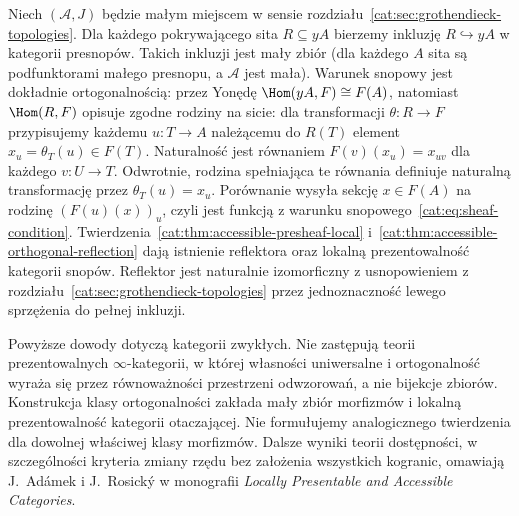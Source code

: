 \begin{przyklad}\label{cat:ex:accessible-orthogonal-sheaves}
Niech $(\mathcal A,J)$ będzie małym miejscem w sensie rozdziału~\ref{cat:sec:grothendieck-topologies}. Dla każdego pokrywającego sita $R\subseteq yA$ bierzemy inkluzję $R\hookrightarrow yA$ w kategorii presnopów. Takich inkluzji jest mały zbiór (dla każdego $A$ sita są podfunktorami małego presnopu, a $\mathcal A$ jest mała). Warunek snopowy jest dokładnie ortogonalnością: przez Yonędę $\Hom(yA,F)\cong F(A)$, natomiast $\Hom(R,F)$ opisuje zgodne rodziny na sicie: dla transformacji $\theta:R\to F$ przypisujemy każdemu $u:T\to A$ należącemu do $R(T)$ element $x_u=\theta_T(u)\in F(T)$. Naturalność jest równaniem $F(v)(x_u)=x_{uv}$ dla każdego $v:U\to T$. Odwrotnie, rodzina spełniająca te równania definiuje naturalną transformację przez $\theta_T(u)=x_u$. Porównanie wysyła sekcję $x\in F(A)$ na rodzinę $(F(u)(x))_u$, czyli jest funkcją z warunku snopowego~\eqref{cat:eq:sheaf-condition}. Twierdzenia~\ref{cat:thm:accessible-presheaf-local} i~\ref{cat:thm:accessible-orthogonal-reflection} dają istnienie reflektora oraz lokalną prezentowalność kategorii snopów. Reflektor jest naturalnie izomorficzny z usnopowieniem z rozdziału~\ref{cat:sec:grothendieck-topologies} przez jednoznaczność lewego sprzężenia do pełnej inkluzji.
\end{przyklad}

\begin{uwaga}\label{cat:rem:accessible-scope}
Powyższe dowody dotyczą kategorii zwykłych. Nie zastępują teorii prezentowalnych $\infty$-kategorii, w której własności uniwersalne i ortogonalność wyraża się przez równoważności przestrzeni odwzorowań, a nie bijekcje zbiorów. Konstrukcja klasy ortogonalności zakłada mały zbiór morfizmów i lokalną prezentowalność kategorii otaczającej. Nie formułujemy analogicznego twierdzenia dla dowolnej właściwej klasy morfizmów. Dalsze wyniki teorii dostępności, w szczególności kryteria zmiany rzędu bez założenia wszystkich kogranic, omawiają J.~Adámek i J.~Rosický w monografii \emph{Locally Presentable and Accessible Categories}.
\end{uwaga}
